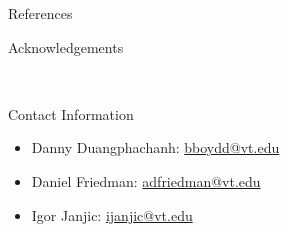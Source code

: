 \documentclass[final]{beamer}
\newlength{\onecolwid}
\begin{document}
\begin{frame}[t]
\begin{columns}[t]
\begin{column}{\onecolwid}

\begin{block}{References}

\nocite{*} %
\small{
\vspace{0.75in}}

\end{block}



\begin{block}{Acknowledgements}

\small{} \\

\end{block}



\begin{alertblock}{Contact Information}

\begin{itemize}
\item Danny Duangphachanh: \href{mailto:bboydd@vt.edu}{bboydd@vt.edu}
\item Daniel Friedman: \href{mailto:adfriedman@vt.edu}{adfriedman@vt.edu}
\item Igor Janjic: \href{mailto:ijanjic@vt.edu}{ijanjic@vt.edu}
\end{itemize}

\end{alertblock}


\end{column}
\end{columns}
\end{frame}
\end{document}
